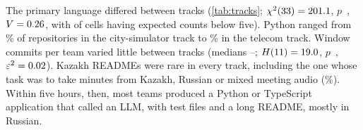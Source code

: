 \documentclass{article}
\begin{document}
The primary language differed between tracks (\cref{tab:tracks}; $\chi^2(\num{33}) = \num{201.1}$, $p$~\NRqThreeLanguageByTrackP, $V = \num{0.26}$, with \NRqThreeLanguageByTrackCellsExpectedBelowFive{} of \NRqThreeLanguageByTrackCells{} cells having expected counts below five). Python ranged from \NRqThreeTracksTOneTwoPython\% of repositories in the city-simulator track to \NRqThreeTracksTZeroFourPython\% in the telecom track. Window commits per team varied little between tracks (medians \NRqThreeCommitsByTrackMedianMin--\NRqThreeCommitsByTrackMedianMax; $H(\num{11}) = \num{19.0}$, $p$~\NRqThreeCommitsByTrackP, $\varepsilon^2 = \num{0.02}$). Kazakh READMEs were rare in every track, including the one whose task was to take minutes from Kazakh, Russian or mixed meeting audio (\NRqThreeTracksTZeroEightKazakh\%). Within five hours, then, most teams produced a Python or TypeScript application that called an LLM, with test files and a long README, mostly in Russian.
\end{document}
